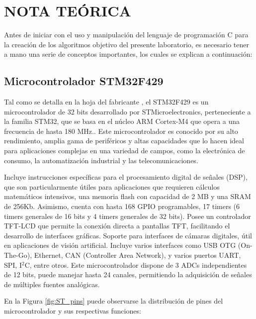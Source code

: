 \newpage
\section{NOTA TEÓRICA}

Antes de iniciar con el uso y manipulación del lenguaje de programación C para la creación de los algoritmos objetivo del presente laboratorio, es necesario tener a mano una serie de conceptos importantes, los cuales se explican a continuación: 

\subsection{Microcontrolador STM32F429}
Tal como se detalla en la hoja del fabricante \cite{ST}, el STM32F429 es un microcontrolador de 32 bits desarrollado por STMicroelectronics, perteneciente a la familia STM32, que se basa en el núcleo ARM Cortex-M4 que opera a una frecuencia de hasta 180 MHz.. Este microcontrolador es conocido por su alto rendimiento, amplia gama de periféricos y altas capacidades que lo hacen ideal para aplicaciones complejas en una variedad de campos, como la electrónica de consumo, la automatización industrial y las telecomunicaciones.

Incluye instrucciones específicas para el procesamiento digital de señales (DSP), que son particularmente útiles para aplicaciones que requieren cálculos matemáticos intensivos, una memoria flash con capacidad de 2 MB y una SRAM de 256Kb. Asimismo, cuenta con hasta 168 GPIO programables, 17 timers (6 timers generales de 16 bits y 4 timers generales de 32 bits). Posee un controlador TFT-LCD que permite la conexión directa a pantallas TFT, facilitando el desarrollo de interfaces gráficas. Soporte para interfaces de cámaras digitales, útil en aplicaciones de visión artificial. Incluye varios interfaces como USB OTG (On-The-Go), Ethernet, CAN (Controller Area Network), y varios puertos UART, SPI, I$^2$C, entre otros. Este microcontrolador dispone de 3 ADCs independientes de 12 bits, puede manejar hasta 24 canales, permitiendo la adquisición de señales de múltiples fuentes analógicas. 

En la Figura \ref{fig:ST_pins} puede observarse la distribución de pines del microcontrolador y sus respectivas funciones:  

